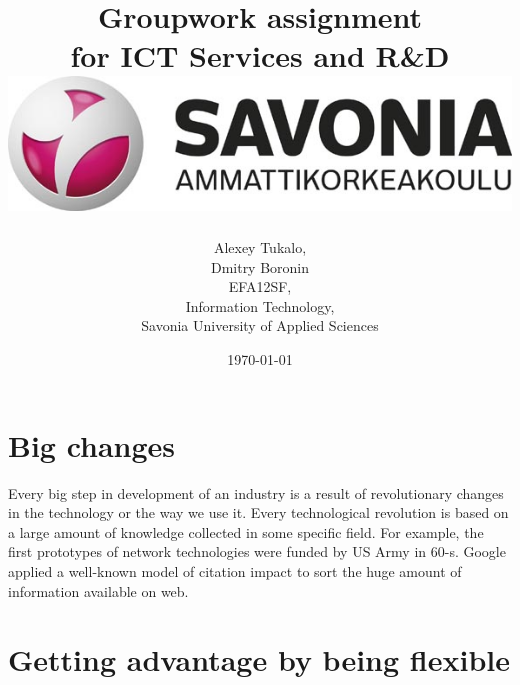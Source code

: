 \documentclass[english]{article}
\date{}
\begin{document}
\title{\vspace{2in}Groupwork assignment\\
\small for ICT Services and R\&D\\
\vspace{0.5in}\includegraphics{savonia.jpg}}

\nopagebreak
\maketitle


\vspace{3in}

\author{
\begin{flushright}
Alexey Tukalo,\\
Dmitry Boronin\\
EFA12SF,\\
Information Technology,\\
Savonia University of Applied Sciences
\end{flushright}
}

\date{\today}
\thispagestyle{empty}



\section{Big changes}

Every big step in development of an industry is a result of revolutionary changes in the technology or the way we use it. Every technological revolution is based on a large amount of knowledge collected in some specific field. For example, the first prototypes of network technologies were funded by US Army in 60-s. Google applied a well-known model of citation impact to sort the huge amount of information available on web.

\section{Getting advantage by being flexible} 
\end{document}
